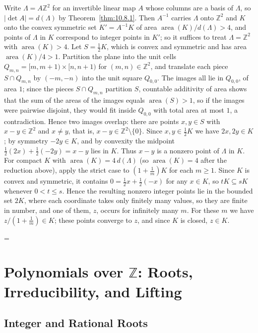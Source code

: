 \documentclass[11pt]{article}
\makeatletter
\theoremstyle{ntstyle}
\let\nt@closedisplay\]
\def\nt@guardedclose{\@ifnextchar\par{\nt@closeafterpar}{\@ifnextchar\end{\postdisplaypenalty\@M\nt@closedisplay}{\nt@closedisplay}}}
\def\nt@closeafterpar\par{\@ifnextchar\par{\nt@closeafterpar}{\@ifnextchar\end{\postdisplaypenalty\@M\nt@closedisplay\par}{\nt@closedisplay\par}}}
\renewenvironment{proof}[1][\proofname]{\par
  \pushQED{\qed}\normalfont\topsep\medskipamount\edef\nt@afterproof{\@endparpenalty=\the\@endparpenalty\relax}\@beginparpenalty\@M\@endparpenalty\@M\let\]\nt@guardedclose\trivlist\item[]\textit{#1\@addpunct{.}} \ignorespaces}{\ifvmode\addpenalty\@M\fi\popQED\nt@afterproof\endtrivlist\@endpefalse}
\DeclareMathOperator{\area}{area}
\makeatother
\begin{document}
\begin{proof} Write $\Lambda=A\mathbb{Z}^2$ for an
	invertible linear map $A$ whose columns are a basis of $\Lambda$, so
	$|\det A|=d(\Lambda)$ by Theorem~\ref{thm:10.8.1}. Then $A^{-1}$ carries $\Lambda$ onto
	$\mathbb{Z}^2$ and $K$ onto the convex symmetric set $K'=A^{-1}K$ of
	area $\area(K)/d(\Lambda)>4$, and points of $\Lambda$
	in $K$ correspond to integer points in $K'$; so it suffices to treat
	$\Lambda=\mathbb{Z}^2$ with $\area(K)>4$. Let
	$S=\tfrac{1}{2}K$, which is convex and symmetric and has area
	$\area(K)/4>1$. Partition the plane into the unit cells
	$Q_{m,n}=[m,m+1)\times[n,n+1)$ for $(m,n)\in\mathbb{Z}^2$, and
	translate each piece $S\cap Q_{m,n}$ by $(-m,-n)$ into the unit
	square $Q_{0,0}$. The images all lie in $Q_{0,0}$, of area $1$; since the pieces $S\cap Q_{m,n}$ partition $S$, countable additivity of area shows that the sum of the areas of the images equals $\area(S)>1$, so if the images were pairwise disjoint, they would fit inside $Q_{0,0}$ with total area at most $1$, a contradiction. Hence two images overlap:
	there are points $x,y\in S$ with $x-y\in\mathbb{Z}^2$ and $x\neq y$,
	that is, $x-y\in\mathbb{Z}^2\setminus\{0\}$. Since $x,y\in\tfrac{1}{2}K$ we
	have $2x,2y\in K$; by symmetry $-2y\in K$, and by convexity the
	midpoint $\tfrac{1}{2}(2x)+\tfrac{1}{2}(-2y)=x-y$ lies in $K$. Thus $x-y$ is
	a nonzero point of $\Lambda$ in $K$. For compact $K$ with
	$\area(K)=4\,d(\Lambda)$ (so $\area(K)=4$ after the reduction above), apply the strict case to
	$(1+\tfrac{1}{m})K$ for each $m\ge1$. Since $K$ is convex and symmetric,
	it contains $0=\tfrac12x+\tfrac12(-x)$ for any $x\in K$, so $tK\subseteq sK$
	whenever $0<t\le s$. Hence the resulting nonzero integer points lie in the
	bounded set $2K$, where each coordinate takes only finitely many values,
	so they are finite in number, and one of them, $z$, occurs for infinitely
	many $m$. For these $m$ we have $z/(1+\tfrac{1}{m})\in K$; these points
	converge to $z$, and since $K$ is closed, $z\in K$.

\end{proof}
\newpage

\section{Polynomials over \texorpdfstring{$\mathbb{Z}$}{Z}: Roots, Irreducibility, and Lifting}

\subsection{Integer and Rational Roots}
\end{document}
